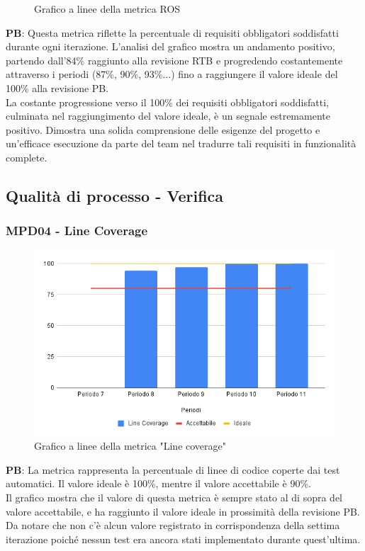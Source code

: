 \documentclass[10pt]{article}
\begin{document}
\begin{justify}
\begin{figure}[H]
  \centering
  \caption{Grafico a linee della metrica ROS}
\end{figure}

\textbf{PB}: Questa metrica riflette la percentuale di requisiti obbligatori soddisfatti durante ogni iterazione. L'analisi del grafico mostra un andamento positivo, partendo dall'84\% raggiunto alla revisione RTB e progredendo costantemente attraverso i periodi (87\%, 90\%, 93\%...) fino a raggiungere il valore ideale del 100\% alla revisione PB.\\
La costante progressione verso il 100\% dei requisiti obbligatori soddisfatti, culminata nel raggiungimento del valore ideale, è un segnale estremamente positivo. Dimostra una solida comprensione delle esigenze del progetto e un'efficace esecuzione da parte del team nel tradurre tali requisiti in funzionalità complete.


\subsection{Qualità di processo - Verifica}
\subsubsection{MPD04 - Line Coverage}

\begin{figure}[H]
  \centering
  \includegraphics[width=0.9\linewidth]{LineCoverage.png}
  \caption{Grafico a linee della metrica "Line coverage"}
\end{figure}

\textbf{PB}: La metrica rappresenta la percentuale di linee di codice coperte dai test automatici. Il valore ideale è 100\%, mentre il valore accettabile è 90\%.\\
Il grafico mostra che il valore di questa metrica è sempre stato al di sopra del valore accettabile, e ha raggiunto il valore ideale in prossimità della revisione PB.\\
Da notare che non c'è alcun valore registrato in corrispondenza della settima iterazione poiché nessun test era ancora stati implementato durante quest'ultima.\\



\end{justify}
\end{document}
